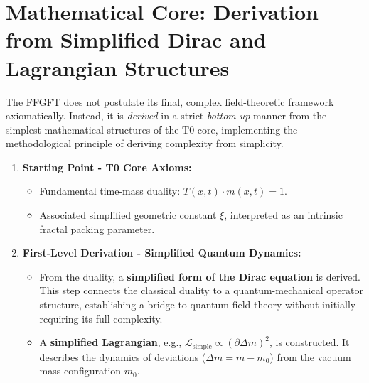 	\section{Mathematical Core: Derivation from Simplified Dirac and Lagrangian Structures}
	
	The FFGFT does not postulate its final, complex field-theoretic framework axiomatically. Instead, it is \emph{derived} in a strict \emph{bottom-up} manner from the simplest mathematical structures of the T0 core, implementing the methodological principle of deriving complexity from simplicity.
	
	\begin{enumerate}
		\item \textbf{Starting Point - T0 Core Axioms:}
		\begin{itemize}
			\item Fundamental time-mass duality: \( T(x,t) \cdot m(x,t) = 1 \).
			\item Associated simplified geometric constant \( \xi \), interpreted as an intrinsic fractal packing parameter.
		\end{itemize}
		
		\item \textbf{First-Level Derivation - Simplified Quantum Dynamics:}
		\begin{itemize}
			\item From the duality, a \textbf{simplified form of the Dirac equation} is derived. This step connects the classical duality to a quantum-mechanical operator structure, establishing a bridge to quantum field theory without initially requiring its full complexity.
			\item A \textbf{simplified Lagrangian}, e.g., \( \mathcal{L}_{\text{simple}} \propto (\partial \Delta m)^2 \), is constructed. It describes the dynamics of deviations (\( \Delta m = m - m_0 \)) from the vacuum mass configuration \( m_0 \).
		\end{itemize}
		

\end{enumerate}
